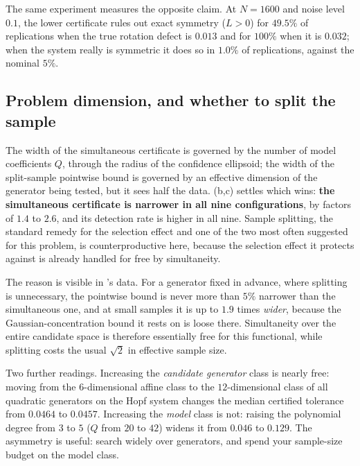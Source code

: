 The same experiment measures the opposite claim. At $N=1600$ and noise level
$0.1$, the lower certificate rules out exact symmetry ($L > 0$) for $49.5\%$
of replications when the true rotation defect is $0.013$ and for $100\%$ when
it is $0.032$; when the system really is symmetric it does so in $1.0\%$ of
replications, against the nominal $5\%$.

\subsection{Problem dimension, and whether to split the sample}
\label{sec:dimension}

The width of the simultaneous certificate is governed by the number of model
coefficients $Q$, through the radius of the confidence ellipsoid; the width of
the split-sample pointwise bound is governed by an effective dimension of the
generator being tested, but it sees half the data. (b,c)
settles which wins: \textbf{the simultaneous certificate is narrower in all
nine configurations}, by factors of $1.4$ to $2.6$, and its detection rate is
higher in all nine. Sample splitting, the standard remedy for the selection
effect and one of the two most often suggested for this problem, is
counterproductive here, because the selection effect it protects against is
already handled for free by simultaneity.

The reason is visible in 's data. For a generator fixed
in advance, where splitting is unnecessary, the pointwise bound is never more
than $5\%$ narrower than the simultaneous one, and at small samples it is up
to $1.9$ times \emph{wider}, because the Gaussian-concentration bound it rests
on is loose there. Simultaneity over the entire candidate space is therefore
essentially free for this functional, while splitting costs the usual
$\sqrt{2}$ in effective sample size.

Two further readings. Increasing the \emph{candidate generator} class is
nearly free: moving from the $6$-dimensional affine class to the
$12$-dimensional class of all quadratic generators on the Hopf system changes
the median certified tolerance from $0.0464$ to $0.0457$. Increasing the
\emph{model} class is not: raising the polynomial degree from $3$ to $5$ ($Q$
from $20$ to $42$) widens it from $0.046$ to $0.129$. The asymmetry is useful:
search widely over generators, and spend your sample-size budget on the model
class.

